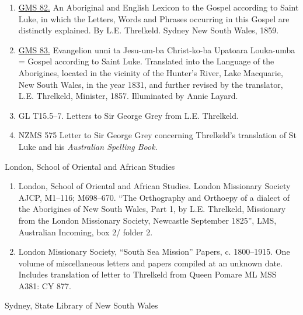 \begin{enumerate}
    \item \href{https://kura.aucklandlibraries.govt.nz/digital/collection/manuscripts/id/13511/rec/2}{GMS 82.} An Aboriginal and English Lexicon to the Gospel according to Saint Luke, in which the Letters, Words and Phrases occurring in this Gos\-pel are distinctly explained. By L.E. Threlkeld. Sydney New South Wales, 1859.
    \item \href{https://kura.aucklandlibraries.govt.nz/digital/collection/manuscripts/id/13367/rec/1}{GMS 83.} Evangelion unni ta Jesu-um-ba Christ-ko-ba Upatoara Louka-\linebreak{}umba = Gospel according to Saint Luke. Translated into the Language of the Aborigines, located in the vicinity of the Hunter’s River, Lake Macquarie, New South Wales, in the year 1831, and further revised by the translator, L.E. Threlkeld, Minister, 1857. Illuminated by Annie Layard.
    \item GL T15.5--7. Letters to Sir George Grey from L.E. Threlkeld.
    \item NZMS 575 Letter to Sir George Grey concerning Threlkeld’s translation of St Luke and his \textit{Australian Spelling Book}.
\end{enumerate}

London, School of Oriental and African Studies

\begin{enumerate}
    \item London, School of Oriental and African Studies. London Missionary Society AJCP, M1--116; M698--670. “The Orthography and Orthoepy of a dialect of the Aborigines of New South Wales, Part 1, by L.E. Threlkeld, Missionary from the London Missionary Society, Newcastle September 1825”, LMS, Australian Incoming, box 2/ folder 2.
    \item London Missionary Society, “South Sea Mission” Papers, c. 1800--1915. One volume of miscellaneous letters and papers compiled at an unknown date. Includes translation of letter to Threlkeld from Queen Pomare ML MSS A381: CY 877.
\end{enumerate}

Sydney, State Library of New South Wales

